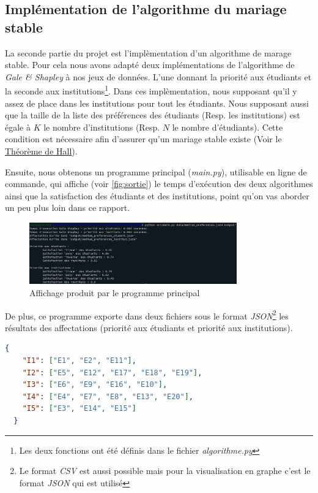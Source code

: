\documentclass[12pt,titlepage]{article}
\begin{document}
\subsection{Implémentation de l'algorithme du mariage stable}

La seconde partie du projet est l'implèmentation d'un algorithme de marage stable. Pour cela nous avons adapté deux implémentations de l'algorithme de \textit{Gale \& Shapley} à nos jeux de données. L'une donnant la priorité aux étudiants et la seconde aux institutions\footnote{Les deux fonctions ont été définis dans le fichier \textit{algorithme.py}}. Dans ces implèmentation, nous supposant qu'il y assez de place dans les institutions pour tout les étudiants. Nous supposant aussi que la taille de la liste des préférences des étudiants (Resp. les institutions) est égale à $K$ le nombre d'institutions (Resp. $N$ le nombre d'étudiants). Cette condition est nécessaire afin d'assurer qu'un mariage stable existe (Voir le \href{https://fr.wikipedia.org/wiki/Th%C3%A9or%C3%A8me_de_Hall}{Théorème de Hall}).

Ensuite, nous obtenons un programme principal (\textit{main.py}), utilisable en ligne de commande, qui affiche (voir \autoref{fig:sortie}) le temps d'exécution des deux algorithmes ainsi que la satisfaction des étudiants et des institutions, point qu'on vas aborder un peu plus loin dans ce rapport. 

\begin{figure}[!h]
  \centering
  \includegraphics[width = 0.8\textwidth]{img/sortie_programme.png}
  \caption{Affichage produit par le programme principal}
  \label{fig:sortie}
\end{figure}

De plus, ce programme exporte dans deux fichiers sous le format \textit{JSON}\footnote{Le format \textit{CSV} est aussi possible mais pour la visualisation en graphe c'est le format \textit{JSON} qui est utilisé} les résultats des affectations (priorité aux étudiants et priorité aux institutions).

\begin{lstlisting}[language=json, caption="Fichier des affectations\, priorité au étudiants"]
  {
    "I1": ["E1", "E2", "E11"],
    "I2": ["E5", "E12", "E17", "E18", "E19"],
    "I3": ["E6", "E9", "E16", "E10"],
    "I4": ["E4", "E7", "E8", "E13", "E20"],
    "I5": ["E3", "E14", "E15"]
  }
\end{lstlisting}
\end{document}
